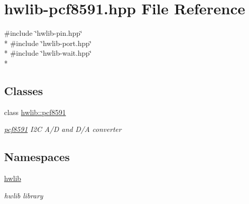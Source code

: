 \hypertarget{hwlib-pcf8591_8hpp}{}\section{hwlib-\/pcf8591.hpp File Reference}
\label{hwlib-pcf8591_8hpp}
{\ttfamily \#include \char`\"{}hwlib-\/pin.\+hpp\char`\"{}}\\*
{\ttfamily \#include \char`\"{}hwlib-\/port.\+hpp\char`\"{}}\\*
{\ttfamily \#include \char`\"{}hwlib-\/wait.\+hpp\char`\"{}}\\*
\subsection*{Classes}
\begin{DoxyCompactItemize}
\item 
class \hyperlink{classhwlib_1_1pcf8591}{hwlib\+::pcf8591}
\begin{DoxyCompactList}\small\item\em \hyperlink{classhwlib_1_1pcf8591}{pcf8591} I2C A/D and D/A converter \end{DoxyCompactList}\end{DoxyCompactItemize}
\subsection*{Namespaces}
\begin{DoxyCompactItemize}
\item 
 \hyperlink{namespacehwlib}{hwlib}
\begin{DoxyCompactList}\small\item\em hwlib library \end{DoxyCompactList}\end{DoxyCompactItemize}
